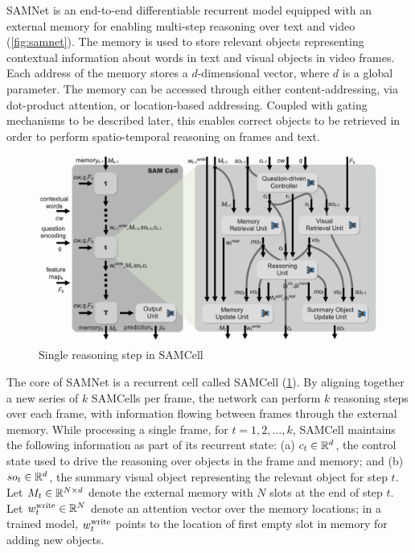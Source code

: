SAMNet is an end-to-end differentiable recurrent model equipped with an external memory for enabling multi-step reasoning over text and video (\cref{fig:samnet}).
The memory is used to store relevant objects representing contextual information about words in text and visual objects in video frames. 
Each address of the memory stores a $d$-dimensional vector, where $d$ is a global parameter.
The memory  can be accessed through either content-addressing, via dot-product attention, or location-based addressing. 
Coupled with gating mechanisms to be described later, this enables correct objects to be retrieved 
in order to perform spatio-temporal reasoning on frames and text. 

\begin{figure}[hbtp]
	\centering
	\includegraphics[width=\textwidth]{../img/architecture/samcell_reasoning}
	\caption{Single reasoning step in SAMCell}
	\label{fig:samcell}
\end{figure}	

The core of SAMNet is a recurrent cell called SAMCell (\cref{fig:samcell}). 
By aligning together a new series of $k$ SAMCells per frame, the network can perform $k$ 
reasoning steps over each frame, with information flowing between frames through the external memory. 
While processing a single frame, for $t=1,2, \dots, k$, SAMCell maintains the following information as part of its recurrent state:
(a) $c_t \in \mathbb{R}^d$, the control state used to drive the reasoning over objects in the frame and memory; and
(b) $so_t  \in \mathbb{R}^d$, the summary visual object representing the relevant object for step $t$.
Let $M_t \in  \mathbb{R}^{N \times d}$ denote the external memory with $N$ slots at the end of step $t$.
Let $w^{\mathrm{write}}_t \in  \mathbb{R}^N$ denote an attention vector over the memory locations;
in a trained model, $w^{\mathrm{write}}_t$ points to the location of first empty slot in memory for adding new objects.   


